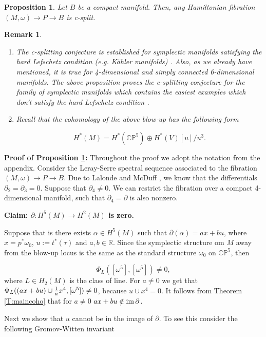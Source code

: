 \documentclass[a4paper,14pt]{article}
\newcommand{\B}[1]{\mathbb #1}
\newcommand{\al}{{\alpha}}
\newcommand{\om}{{\omega}}
\newcommand{\del}{\partial}
\newcommand{\Mo}{(M,\omega )}
\newcommand{\im}{\text {im \!}}
\newcommand{\cp}{{\B C\B P}}
\newcommand{\BS}{{\bigskip}}
\newcommand{\NI}{{\noindent}}
\newtheorem{rem}[theorem]{Remark}
\newtheorem{prop}[theorem]{Proposition}
\numberwithin{equation}{section}
\begin{document}
\begin{prop}\label{P:ex}
Let $B$ be a compact manifold. Then, any Hamiltonian
fibration $\Mo \to P\to B$ is c-split.
\end{prop}



\begin{rem}\label{R:ex}
{\em \hfill

\begin{enumerate}
\item
The c-splitting conjecture is established for symplectic
manifolds satisfying the hard Lefschetz condition (e.g. K\" ahler
manifolds) \cite{bl}. Also, as we already have mentioned,
it is true for 4-dimensional and simply connected 6-dimensional
manifolds. The above proposition proves the c-splitting conjecture
for the family of symplectic manifolds which contains
the easiest examples which don't satisfy  the hard Lefschetz
condition \cite{m1}.
\item
Recall that the cohomology of the above blow-up has the following
form \cite{m1,gi}

$$
H^*(M)=H^*(\cp ^5)\oplus H^*(V)[u]\slash u^3.
$$
\end{enumerate}
}
\end{rem}

\BS

\NI
{\bf Proof of Proposition \ref{P:ex}:}
Throughout the proof we adopt the notation from the
appendix.
Consider the Leray-Serre spectral sequence associated
to the fibration $\Mo \to P\to B$. Due to Lalonde and
McDuff \cite{lm}, we know that the differentials $\del _2 = \del _3 =0$.
Suppose that $\del _4\neq 0$. We can restrict the fibration
over a compact 4-dimensional manifold, such that $\del _4=\del $ is
also nonzero.

\NI
{\bf Claim: $\del :H^5(M)\to H^2(M)$ is zero.}

\NI
Suppose that is there exists $\al \in H^5(M)$
such that $\del (\al ) = ax + bu$, where 
$x=p^*\om _0$, $u:=t^*(\tau )$ and $a,b\in \B R$.
Since the symplectic structure om $M$ away from the
blow-up locus is the same as the standard structure
$\om _0$  on $\cp ^5$,
then

$$
\Phi _L([\om ^5],[\om ^5]) \neq 0,
$$
where $L\in H_2(M)$ is the class of line.
For $a\neq 0$ we get that 
$\Phi _L((ax + bu)\cup {1\over a}x^4, [\om ^5])\neq 0$,
because $u \cup x^4 = 0$. It follows from Theorem \ref{T:maincoho}
that for $a\neq 0$  $ax + bu \notin \im \del $.

Next we show that $u$ cannot be in the image of $\del $.
To see this consider the following Gromov-Witten invariant
\end{document}
